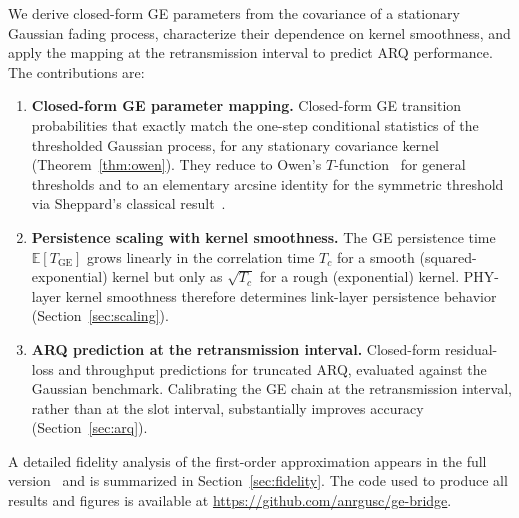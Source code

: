 \documentclass[conference]{IEEEtran}
\newcommand{\ETGE}{\mathbb{E}[T_{\mathrm{GE}}]}
\begin{document}
We derive closed-form GE parameters from the covariance of a stationary Gaussian fading process, characterize their dependence on kernel smoothness, and apply the mapping at the retransmission interval to predict ARQ performance. The contributions are:
\begin{enumerate}
\item \textbf{Closed-form GE parameter mapping.} Closed-form GE transition probabilities that exactly match the one-step conditional statistics of the thresholded Gaussian process, for any stationary covariance kernel (Theorem~\ref{thm:owen}). They reduce to Owen's $T$-function~\cite{owen1956} for general thresholds and to an elementary arcsine identity for the symmetric threshold via Sheppard's classical result~\cite{sheppard1900}.
\item \textbf{Persistence scaling with kernel smoothness.} The GE persistence time $\ETGE$ grows linearly in the correlation time $T_c$ for a smooth (squared-exponential) kernel but only as $\sqrt{T_c}$ for a rough (exponential) kernel. PHY-layer kernel smoothness therefore determines link-layer persistence behavior (Section~\ref{sec:scaling}).
\item \textbf{ARQ prediction at the retransmission interval.} Closed-form residual-loss and throughput predictions for truncated ARQ, evaluated against the Gaussian benchmark. Calibrating the GE chain at the retransmission interval, rather than at the slot interval, substantially improves accuracy (Section~\ref{sec:arq}).
\end{enumerate}
A detailed fidelity analysis of the first-order approximation appears in the full version~\cite{krishnamachari2026} and is summarized in Section~\ref{sec:fidelity}. The code used to produce all results and figures is available at \url{https://github.com/anrgusc/ge-bridge}.
\end{document}
